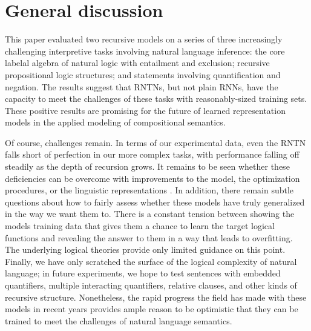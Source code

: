 \section{General discussion}\label{sec:discussion}

This paper evaluated two recursive models on a series of three increasingly
challenging interpretive tasks involving natural language inference:
the core labelal algebra of natural logic with entailment and
exclusion; recursive propositional logic structures; and statements
involving quantification and negation. The results suggest that RNTNs,
but not plain RNNs, have the capacity to meet the challenges of these
tasks with reasonably-sized training sets. These positive results are
promising for the future of learned representation models in the
applied modeling of compositional semantics.

Of course, challenges remain. In terms of our experimental data, even
the RNTN falls short of perfection in our more complex tasks, with
performance falling off steadily as the depth of recursion grows. It
remains to be seen whether these deficiencies can be overcome with
improvements to the model, the optimization procedures, or the
linguistic representations
\cite{sochergrounded,kalchbrenner2014convolutional}. In addition,
there remain subtle questions about how to fairly assess whether these
models have truly generalized in the way we want them to. There is a
constant tension between showing the models training data that gives
them a chance to learn the target logical functions and revealing the
answer to them in a way that leads to overfitting. The underlying
logical theories provide only limited guidance on this point.
%
%
%
Finally, we have only scratched the surface of the logical complexity
of natural language; in future experiments, we hope to test sentences
with embedded quantifiers, multiple interacting quantifiers, relative
clauses, and other kinds of recursive structure. Nonetheless, the
rapid progress the field has made with these models in recent years
provides ample reason to be optimistic that they can be trained to
meet the challenges of natural language semantics.

